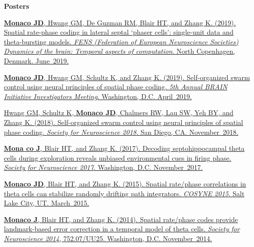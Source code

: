 \documentclass[10pt]{article}
\begin{document}
\begin{description}
\item \textbf{Posters}

\item[\quad]
\href{https://www.fens.org/Meetings/The-Brain-Conferences/Dynamics-of-the-brain/
}{\textbf{Monaco JD}, Hwang GM, De Guzman RM, Blair HT, and Zhang K. (2019).
Spatial rate-phase coding in lateral septal ‘phaser cells’: single-unit data
and theta-bursting models. \emph{FENS (Federation of European Neuroscience
Societies) Dynamics of the brain: Temporal aspects of computation}. North
Copenhagen, Denmark. June~2019.}
\item[\quad]
\href{http://www.cvent.com/events/5th-annual-brain-initiative-investigators-meet
ing/event-summary-de9c0d8f934b46eb8d80b55bcfbfe96a.aspx}{\textbf{Monaco JD},
Hwang GM, Schultz K, and Zhang K. (2019). Self-organized swarm control using
neural principles of spatial phase coding. \emph{5th Annual BRAIN Initiative
Investigators Meeting}. Washington, D.C. April~2019.}
\item[\quad]
\href{https://abstractsonline.com/pp8/#!/4649/presentation/10884}{Hwang GM,
Schultz K, \textbf{Monaco JD}, Chalmers RW, Lau SW, Yeh BY, and Zhang K. (2018).
Self-organized swarm control using neural principles of spatial phase coding.
\emph{Society for Neuroscience 2018}. San Diego, CA. November~2018.}
\item[\quad]
\href{http://www.abstractsonline.com/pp8/#!/4376/presentation/6085}{\textbf{Mona
co J}, Blair HT, and Zhang K. (2017). Decoding septohippocampal theta cells
during exploration reveals unbiased environmental cues in firing phase.
\emph{Society for Neuroscience 2017}. Washington, D.C. November~2017.}
\item[\quad]
\href{http://jdmonaco.com/files/monaco-paper-cosyne15.pdf}{\textbf{Monaco JD},
Blair HT, and Zhang K. (2015). Spatial rate/phase correlations in theta cells
can stabilize randomly drifting path integrators. \emph{COSYNE 2015}. Salt Lake
City, UT. March~2015.}
\item[\quad]
\href{http://www.abstractsonline.com/Plan/ViewAbstract.aspx?sKey=973d2662-ba7a-4
ad2-aff9-fe0d4b77c262&cKey=9917ffaf-9e31-4213-acb9-4aab498ab4cd&mKey=54c85d94-6d
69-4b09-afaa-502c0e680ca7}{\textbf{Monaco J}, Blair HT, and Zhang K. (2014).
Spatial rate/phase codes provide landmark-based error correction in a temporal
model of theta cells. \emph{Society for Neuroscience 2014}, 752.07/UU25.
Washington, D.C. November~2014.}
\item[\quad]

\end{description}
\end{document}
